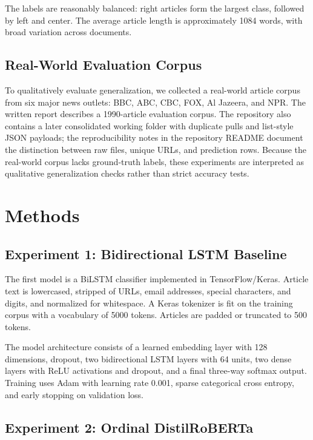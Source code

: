 \documentclass[10pt,twocolumn]{article}
\begin{document}
The labels are reasonably balanced: right articles form the largest class,
followed by left and center. The average article length is approximately 1084
words, with broad variation across documents.

\subsection{Real-World Evaluation Corpus}

To qualitatively evaluate generalization, we collected a real-world article
corpus from six major news outlets: BBC, ABC, CBC, FOX, Al Jazeera, and NPR.
The written report describes a 1990-article evaluation corpus. The repository
also contains a later consolidated working folder with duplicate pulls and
list-style JSON payloads; the reproducibility notes in the repository README
document the distinction between raw files, unique URLs, and prediction rows.
Because the real-world corpus lacks ground-truth labels, these experiments are
interpreted as qualitative generalization checks rather than strict accuracy
tests.

\section{Methods}

\subsection{Experiment 1: Bidirectional LSTM Baseline}

The first model is a BiLSTM classifier implemented in TensorFlow/Keras. Article
text is lowercased, stripped of URLs, email addresses, special characters, and
digits, and normalized for whitespace. A Keras tokenizer is fit on the training
corpus with a vocabulary of 5000 tokens. Articles are padded or truncated to
500 tokens.

The model architecture consists of a learned embedding layer with 128
dimensions, dropout, two bidirectional LSTM layers with 64 units, two dense
layers with ReLU activations and dropout, and a final three-way softmax output.
Training uses Adam with learning rate 0.001, sparse categorical cross entropy,
and early stopping on validation loss.

\subsection{Experiment 2: Ordinal DistilRoBERTa}
\end{document}
